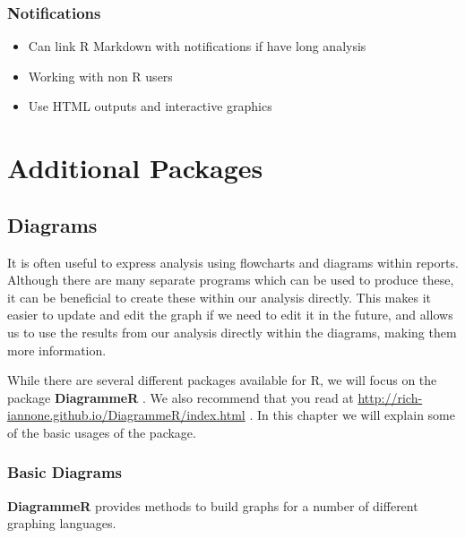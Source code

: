 \documentclass[]{book}
\providecommand{\tightlist}{%
  \setlength{\itemsep}{0pt}\setlength{\parskip}{0pt}}
\theoremstyle{definition}
\theoremstyle{definition}
\theoremstyle{definition}
\theoremstyle{remark}
\begin{document}
\hypertarget{notifications}{%
\section{Notifications}\label{notifications}}

\begin{itemize}
\tightlist
\item
  Can link R Markdown with notifications if have long analysis
\end{itemize}

\begin{itemize}
\tightlist
\item
  Working with non R users
\item
  Use HTML outputs and interactive graphics
\end{itemize}

\hypertarget{part-additional-packages}{%
\part{Additional Packages}\label{part-additional-packages}}

\hypertarget{diagrams}{%
\chapter{Diagrams}\label{diagrams}}

It is often useful to express analysis using flowcharts and diagrams
within reports. Although there are many separate programs which can be
used to produce these, it can be beneficial to create these within our
analysis directly. This makes it easier to update and edit the graph if
we need to edit it in the future, and allows us to use the results from
our analysis directly within the diagrams, making them more information.

While there are several different packages available for R, we will
focus on the package \textbf{DiagrammeR} \citep{R-DiagrammeR}. We also
recommend that you read at
\url{http://rich-iannone.github.io/DiagrammeR/index.html} . In this
chapter we will explain some of the basic usages of the package.

\hypertarget{basic-diagrams}{%
\section{Basic Diagrams}\label{basic-diagrams}}

\textbf{DiagrammeR} provides methods to build graphs for a number of
different graphing languages.
\end{document}
